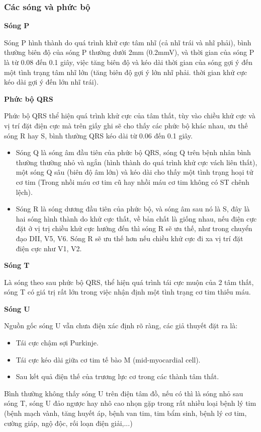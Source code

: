 \subsubsection{Các sóng và phức bộ}
\textbf{Sóng P}\par
Sóng P hình thành do quá trình khử cực tâm nhĩ (cả nhĩ trái và nhĩ phải), bình thường biên độ của sóng P thường dưới 2mm (0.2mmV), và thời gian của sóng P là từ 0.08 đến 0.1 giây, việc tăng biên độ và kéo dài thời gian của sóng gợi ý đến một tình trạng tâm nhĩ lớn (tăng biên độ gợi ý lớn nhĩ phải. thời gian khử cực kéo dài gợi ý đến lớn nhĩ trái).\par
\textbf{Phức bộ QRS}\par
Phức bộ QRS thể hiện quá trình khử cực của tâm thất, tùy vào chiều khử cực và vị trí đặt điện cực mà trên giấy ghi sẽ cho thấy các phức bộ khác nhau, ưu thế sóng R hay S, bình thường QRS kéo dài từ 0.06 đến 0.1 giây.
\begin{itemize}
    \item Sóng Q là sóng âm đầu tiên của phức bộ QRS, sóng Q trên bệnh nhân bình thường thường nhỏ và ngắn (hình thành do quá trình khử cực vách liên thất), một sóng Q sâu (biên độ âm lớn) và kéo dài cho thấy một tình trạng hoại tử cơ tim (Trong nhồi máu cơ tim cũ hay nhồi máu cơ tim không có ST chênh lệch).
    \item Sóng R là sóng dương đầu tiên của phức bộ, và sóng âm sau nó là S, đây là hai sóng hình thành do khử cực thất, về bản chất là giống nhau, nếu điện cực đặt ở vị trị chiều khử cực hướng đến thì sóng R sẽ ưu thế, như trong chuyển đạo DII, V5, V6. Sóng R sẽ ưu thế hơn nếu chiều khử cực đi xa vị trí đặt điện cực như V1, V2.
\end{itemize}
\par
\textbf{Sóng T}\par
Là sóng theo sau phức bộ QRS, thể hiện quá trình tái cực muộn của 2 tâm thất, sóng T có giá trị rất lớn trong việc nhận định một tình trạng cơ tim thiếu máu.\par
\textbf{Sóng U}\par
Nguồn gốc sóng U vẫn chưa điện xác định rõ ràng, các giả thuyết đặt ra là:
\begin{itemize}
    \item Tái cực chậm sợi Purkinje.
    \item Tái cực kéo dài giữa cơ tim tế bào M (mid-myocardial cell).
    \item Sau kết quả điện thế của trương lực cơ trong các thành tâm thất.
\end{itemize}
Bình thường không thấy sóng U trên điện tâm đồ, nếu có thì là sóng nhỏ sau sóng T, sóng U đảo ngược hay nhô cao nhọn gặp trong rất nhiều loại bệnh lý tim (bệnh mạch vành, tăng huyết áp, bệnh van tim, tim bẩm sinh, bệnh lý cơ tim, cường giáp, ngộ độc, rối loạn điện giải,...)
